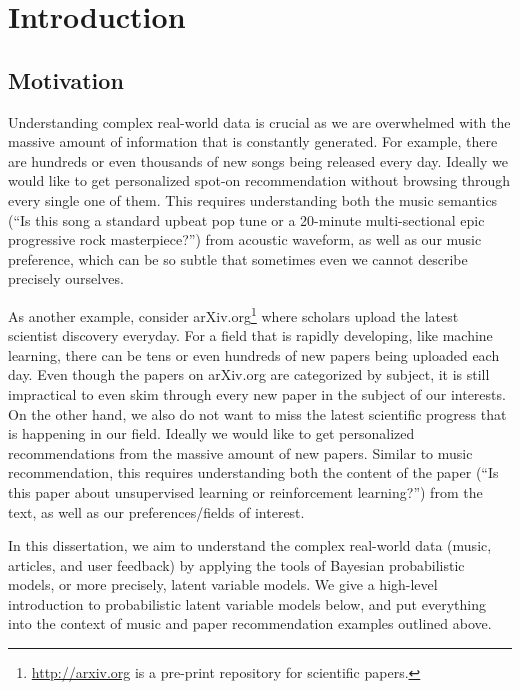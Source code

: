 
\chapter{Introduction}\label{chpt:intro}

\section{Motivation}\label{chpt:intro:sec:motivation}

Understanding complex real-world data is crucial as we are overwhelmed with the massive amount of information that is constantly generated. For example, there are hundreds or even thousands of new songs being released every day. Ideally we would like to get personalized spot-on recommendation without browsing through every single one of them. This requires understanding both the music semantics (``Is this song a standard upbeat pop tune or a 20-minute multi-sectional epic progressive rock masterpiece?'') from acoustic waveform, as well as our music preference, which can be so subtle that sometimes even we cannot describe precisely ourselves.  

As another example, consider arXiv.org\footnote{\url{http://arxiv.org} is a pre-print repository
for scientific papers.} where scholars upload the latest scientist discovery everyday. For a field that is rapidly developing, like machine learning, there can be tens or even hundreds of new papers being uploaded each day. Even though the papers on arXiv.org are categorized by subject, it is still impractical to even skim through every new paper in the subject of our interests. On the other hand, we also do not want to miss the latest scientific progress that is happening in our field. Ideally we would like to get personalized recommendations from the massive amount of new papers. Similar to music recommendation, this requires understanding both the content of the paper (``Is this paper about unsupervised learning or reinforcement learning?'') from the text, as well as our preferences/fields of interest. 

In this dissertation, we aim to understand the complex real-world data (music, articles, and user feedback) by applying the tools of Bayesian probabilistic models, or more precisely, latent variable models. We give a high-level introduction to probabilistic latent variable models below, and put everything into the context of music and paper recommendation examples outlined above. 

